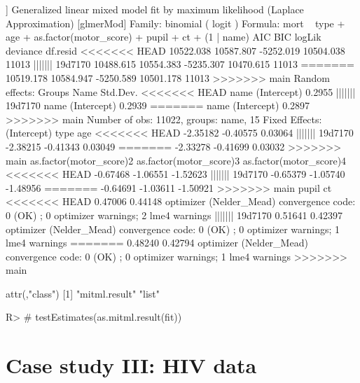 \documentclass[
]{jss}
\begin{document}
\begin{CodeChunk}
\begin{CodeOutput}
[[5]]
Generalized linear mixed model fit by maximum likelihood (Laplace
  Approximation) [glmerMod]
 Family: binomial  ( logit )
Formula: mort ~ type + age + as.factor(motor_score) + pupil + ct + (1 |  
    name)
      AIC       BIC    logLik  deviance  df.resid 
<<<<<<< HEAD
10522.038 10587.807 -5252.019 10504.038     11013 
||||||| 19d7170
10488.615 10554.383 -5235.307 10470.615     11013 
=======
10519.178 10584.947 -5250.589 10501.178     11013 
>>>>>>> main
Random effects:
 Groups Name        Std.Dev.
<<<<<<< HEAD
 name   (Intercept) 0.2955  
||||||| 19d7170
 name   (Intercept) 0.2939  
=======
 name   (Intercept) 0.2897  
>>>>>>> main
Number of obs: 11022, groups:  name, 15
Fixed Effects:
            (Intercept)                     type                      age  
<<<<<<< HEAD
               -2.35182                 -0.40575                  0.03064  
||||||| 19d7170
               -2.38215                 -0.41343                  0.03049  
=======
               -2.33278                 -0.41699                  0.03032  
>>>>>>> main
as.factor(motor_score)2  as.factor(motor_score)3  as.factor(motor_score)4  
<<<<<<< HEAD
               -0.67468                 -1.06551                 -1.52623  
||||||| 19d7170
               -0.65379                 -1.05740                 -1.48956  
=======
               -0.64691                 -1.03611                 -1.50921  
>>>>>>> main
                  pupil                       ct  
<<<<<<< HEAD
                0.47006                  0.44148  
optimizer (Nelder_Mead) convergence code: 0 (OK) ; 0 optimizer warnings; 2 lme4 warnings 
||||||| 19d7170
                0.51641                  0.42397  
optimizer (Nelder_Mead) convergence code: 0 (OK) ; 0 optimizer warnings; 1 lme4 warnings 
=======
                0.48240                  0.42794  
optimizer (Nelder_Mead) convergence code: 0 (OK) ; 0 optimizer warnings; 1 lme4 warnings 
>>>>>>> main

attr(,"class")
[1] "mitml.result" "list"        
\end{CodeOutput}
\begin{CodeInput}
R> # testEstimates(as.mitml.result(fit))
\end{CodeInput}
\end{CodeChunk}

\hypertarget{case-study-iii-hiv-data}{%
\section{Case study III: HIV data}\label{case-study-iii-hiv-data}}
\end{document}

